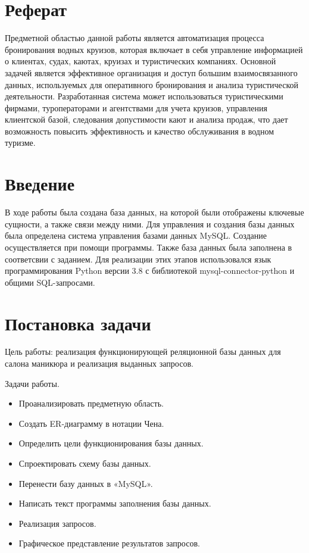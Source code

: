 \documentclass[11pt,a4paper,final]{article}
\begin{document}
\newpage
\clearpage

\newpage
\section* {Реферат}
Предметной областью данной работы является автоматизация процесса бронирования водных круизов, которая включает в себя управление информацией о клиентах, судах, каютах, круизах и туристических компаниях. Основной задачей является эффективное организация и доступ большим взаимосвязанного данных, используемых для оперативного бронирования и анализа туристической деятельности. Разработанная система может использоваться туристическими фирмами, туроператорами и агентствами для учета круизов, управления клиентской базой, следования допустимости кают и анализа продаж, что дает возможность повысить эффективность и качество обслуживания в водном туризме.

\newpage
\tableofcontents

\newpage
\section* {Введение}
В ходе работы была создана база данных, на которой были отображены ключевые сущности, а также связи между ними. Для управления и создания базы данных была определена система управления базами данных MySQL. Создание осуществляется при помощи программы. Также база данных была заполнена в соответсвии с заданием. Для реализации этих этапов использовался язык программирования Python версии 3.8 с библиотекой mysql-connector-python и общими SQL-запросами.

\newpage
\section* {Постановка задачи}
\par Цель работы: реализация функционирующей реляционной базы данных
для салона маникюра и реализация выданных запросов.
\par Задачи работы.
\begin{itemize}
\item Проанализировать предметную область.
\item Создать ER-диаграмму в нотации Чена.
\item Определить цели функционирования базы данных.
\item Спроектировать схему базы данных.
\item Перенести базу данных в «MySQL».
\item Написать текст программы заполнения базы данных.
\item Реализация запросов.
\item Графическое представление результатов запросов.

\end{itemize}
\end{document}
